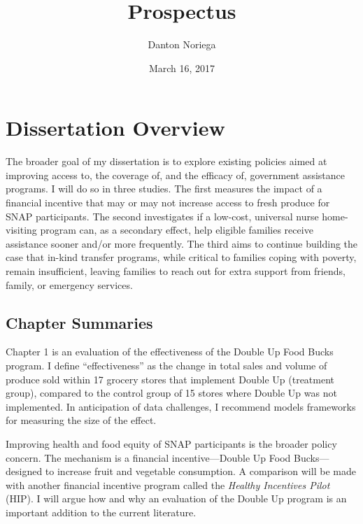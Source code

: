 \documentclass[12pt,letterpaperpaper,]{book}
\title{Prospectus}
\author{Danton Noriega}
\date{March 16, 2017}
\begin{document}
\maketitle

\setlength{\abovedisplayskip}{-5pt}
\setlength{\abovedisplayshortskip}{-5pt}
\mainmatter

{
\setcounter{tocdepth}{2}
\tableofcontents
}
\chapter*{Dissertation Overview}\label{dissertation-overview}

The broader goal of my dissertation is to explore existing policies
aimed at improving access to, the coverage of, and the efficacy of,
government assistance programs. I will do so in three studies. The first
measures the impact of a financial incentive that may or may not
increase access to fresh produce for SNAP participants. The second
investigates if a low-cost, universal nurse home-visiting program can,
as a secondary effect, help eligible families receive assistance sooner
and/or more frequently. The third aims to continue building the case
that in-kind transfer programs, while critical to families coping with
poverty, remain insufficient, leaving families to reach out for extra
support from friends, family, or emergency services.

\section*{Chapter Summaries}\label{chapter-summaries}

Chapter 1 is an evaluation of the effectiveness of the Double Up Food
Bucks program. I define ``effectiveness'' as the change in total sales
and volume of produce sold within 17 grocery stores that implement
Double Up (treatment group), compared to the control group of 15 stores
where Double Up was not implemented. In anticipation of data challenges,
I recommend models frameworks for measuring the size of the effect.

Improving health and food equity of SNAP participants is the broader
policy concern. The mechanism is a financial incentive---Double Up Food
Bucks---designed to increase fruit and vegetable consumption. A
comparison will be made with another financial incentive program called
the \emph{Healthy Incentives Pilot} (HIP). I will argue how and why an
evaluation of the Double Up program is an important addition to the
current literature.
\end{document}
